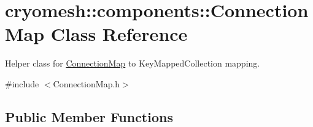 \hypertarget{classcryomesh_1_1components_1_1ConnectionMap}{\section{cryomesh\-:\-:components\-:\-:\-Connection\-Map \-Class \-Reference}
\label{classcryomesh_1_1components_1_1ConnectionMap}
}


\-Helper class for \hyperlink{classcryomesh_1_1components_1_1ConnectionMap}{\-Connection\-Map} to \-Key\-Mapped\-Collection mapping.  




{\ttfamily \#include $<$\-Connection\-Map.\-h$>$}

\subsection*{\-Public \-Member \-Functions}
